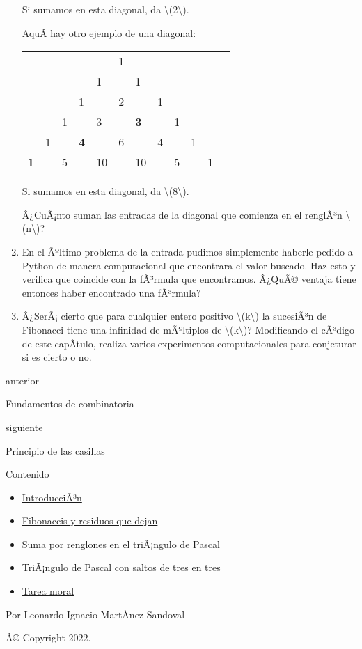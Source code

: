 \documentclass[
]{article}
\providecommand{\tightlist}{%
  \setlength{\itemsep}{0pt}\setlength{\parskip}{0pt}}
\begin{document}
\begin{enumerate}
  Si sumamos en esta diagonal, da {\textbackslash(2\textbackslash)}.

  AquÃ­ hay otro ejemplo de una diagonal:

  \begin{longtable}[]{@{}llllllllllll@{}}
  \toprule\noalign{}
  & & & & & & & & & & & \\
  \midrule\noalign{}
  \endhead
  \bottomrule\noalign{}
  \endlastfoot
  & & & & & 1 & & & & & & \\
  & & & & 1 & & 1 & & & & & \\
  & & & 1 & & 2 & & 1 & & & & \\
  & & 1 & & 3 & & \textbf{3} & & 1 & & & \\
  & 1 & & \textbf{4} & & 6 & & 4 & & 1 & & \\
  \textbf{1} & & 5 & & 10 & & 10 & & 5 & & 1 & \\
  \end{longtable}

  Si sumamos en esta diagonal, da {\textbackslash(8\textbackslash)}.

  Â¿CuÃ¡nto suman las entradas de la diagonal que comienza en el
  renglÃ³n {\textbackslash(n\textbackslash)}?
\item
  En el Ãºltimo problema de la entrada pudimos simplemente haberle
  pedido a Python de manera computacional que encontrara el valor
  buscado. Haz esto y verifica que coincide con la fÃ³rmula que
  encontramos. Â¿QuÃ© ventaja tiene entonces haber encontrado una
  fÃ³rmula?
\item
  Â¿SerÃ¡ cierto que para cualquier entero positivo
  {\textbackslash(k\textbackslash)} la sucesiÃ³n de Fibonacci tiene una
  infinidad de mÃºltiplos de {\textbackslash(k\textbackslash)}?
  Modificando el cÃ³digo de este capÃ­tulo, realiza varios experimentos
  computacionales para conjeturar si es cierto o no.
\end{enumerate}

\href{IntroCombinatoria.html}{\emph{}}

anterior

Fundamentos de combinatoria

\href{Casillas.html}{}

siguiente

Principio de las casillas

\emph{}

\emph{} Contenido

\begin{itemize}
\tightlist
\item
  \hyperref[introduccion]{IntroducciÃ³n}
\item
  \hyperref[fibonaccis-y-residuos-que-dejan]{Fibonaccis y residuos que
  dejan}
\item
  \hyperref[suma-por-renglones-en-el-triangulo-de-pascal]{Suma por
  renglones en el triÃ¡ngulo de Pascal}
\item
  \hyperref[triangulo-de-pascal-con-saltos-de-tres-en-tres]{TriÃ¡ngulo
  de Pascal con saltos de tres en tres}
\item
  \hyperref[tarea-moral]{Tarea moral}
\end{itemize}

Por Leonardo Ignacio MartÃ­nez Sandoval

Â© Copyright 2022.\\
\end{document}
